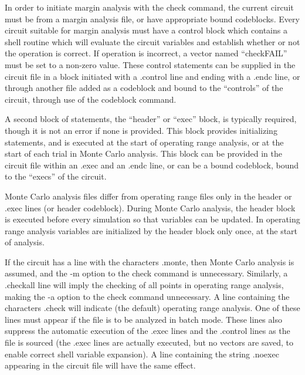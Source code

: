 In order to initiate margin analysis with the {\cb check} command, the
current circuit must be from a margin analysis file, or have
appropriate bound codeblocks.  Every circuit suitable for margin
analysis must have a control block which contains a shell routine
which will evaluate the circuit variables and establish whether or not
the operation is correct.  If operation is incorrect, a vector named
``{\et checkFAIL}'' must be set to a non-zero value.  These control
statements can be supplied in the circuit file in a block initiated
with a {\vt .control} line and ending with a {\vt .endc} line, or
through another file added as a codeblock and bound to the
``controls'' of the circuit, through use of the {\cb codeblock}
command.

A second block of statements, the ``header'' or ``exec'' block, is
typically required, though it is not an error if none is provided. 
This block provides initializing statements, and is executed at the
start of operating range analysis, or at the start of each trial in
Monte Carlo analysis.  This block can be provided in the circuit file
within an {\vt .exec} and an {\vt .endc} line, or can be a bound
codeblock, bound to the ``execs'' of the circuit.

Monte Carlo analysis files differ from operating range files only in
the header or {\vt .exec} lines (or header codeblock).  During Monte
Carlo analysis, the header block is executed before every simulation
so that variables can be updated.  In operating range analysis
variables are initialized by the header block only once, at the start
of analysis.

If the circuit has a line with the characters {\vt .monte}, then Monte
Carlo analysis is assumed, and the {\vt -m} option to the {\cb check}
command is unnecessary.  Similarly, a {\vt .checkall} line will imply
the checking of all points in operating range analysis, making the
{\vt -a} option to the check command unnecessary.  A line containing
the characters {\vt .check} will indicate (the default) operating
range analysis.  One of these lines must appear if the file is to be
analyzed in batch mode.  These lines also suppress the automatic
execution of the {\vt .exec} lines and the {\vt .control} lines as the
file is sourced (the {\vt .exec} lines are actually executed, but no
vectors are saved, to enable correct shell variable expansion).  A
line containing the string {\vt .noexec} appearing in the circuit file
will have the same effect.

